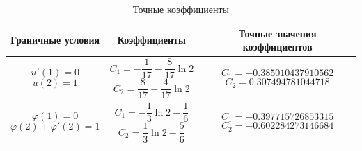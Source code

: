 \documentclass{article}
\begin{document}
\begin{table}[!h]
\centering
\begin{tabular}{|c|c|c|}
	\hline
	Граничные условия &
	Коэффициенты & 
	Точные значения коэффициентов \\
	\hline \hline

\parbox[c]{3cm}{
	\begin{displaymath}
		u'(1) = 0
	\end{displaymath}
	\begin{displaymath}
		u(2) = 1
	\end{displaymath}
} &

\parbox[c]{3cm}{
 	\begin{displaymath}
 		C_{1} = - \frac{1}{17} - \frac{8}{17} \ln{2}
 	\end{displaymath}
	\begin{displaymath} 	
 		C_{2} = \frac{8}{17} - \frac{4}{17} \ln{2}
 	\end{displaymath}
 	} & 
 	
\parbox[c]{4.07cm}{
 	\begin{displaymath}
 		C_{1} = -0.385010437910562 
 	\end{displaymath}
 	\begin{displaymath}
 		C_{2} = 0.307494781044718
 	\end{displaymath}
 	}\\	\hline
	
\parbox[c]{3cm}{
	\begin{displaymath}
		\varphi(1) = 0
	\end{displaymath}
	\begin{displaymath}
		\varphi(2) + \varphi'(2) = 1
	\end{displaymath}
	} &

\parbox[c]{3cm}{
 	\begin{displaymath}
 		C_{1} = - \frac{1}{3} \ln{2} - \frac{1}{6} 
 	\end{displaymath}
	\begin{displaymath} 	
 		C_{2} = \frac{1}{3} \ln{2} - \frac{5}{6}
 	\end{displaymath}
 	} & 
 	
\parbox[c]{4.07cm}{
 	\begin{displaymath}
 		C_{1} = -0.397715726853315
 	\end{displaymath}
 	\begin{displaymath}
 		C_{2} = -0.602284273146684
 	\end{displaymath}
 	}\\	\hline
\end{tabular}
\caption{Точные коэффициенты}
\label{table_exact_coefficients}
\end{table}
\end{document}
